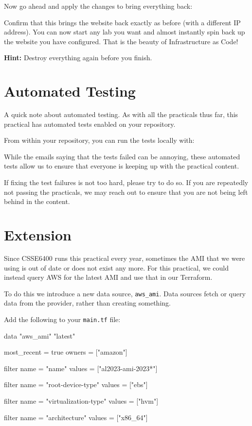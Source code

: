 \documentclass{csse4400}
\begin{document}
Now go ahead and apply the changes to bring everything back:

Confirm that this brings the website back exactly as before (with a different IP address).
You can now start any lab you want and almost instantly spin back up the website you have configured.
That is the beauty of Infrastructure as Code!

\textbf{Hint:} Destroy everything again before you finish.


\section{Automated Testing}
A quick note about automated testing.
As with all the practicals thus far,
this practical has automated tests enabled on your repository.

From within your repository, you can run the tests locally with:

While the emails saying that the tests failed can be annoying,
these automated tests allow us to ensure that everyone is keeping up with the practical content.

If fixing the test failures is not too hard,
please try to do so.
If you are repeatedly not passing the practicals,
we may reach out to ensure that you are not being left behind in the content.


\section{Extension}


Since CSSE6400 runs this practical every year, sometimes the AMI that we were using is out of date or does not exist any more.
For this practical, we could instead query AWS for the latest AMI and use that in our Terraform.

To do this we introduce a new data source, \texttt{aws\_ami}.
Data sources fetch or query data from the provider, rather than creating something.

Add the following to your \texttt{main.tf} file:

\begin{code}[language=terraform,numbers=none]{}
data "aws_ami" "latest" {
  most_recent = true
  owners      = ["amazon"]

  filter {
    name   = "name"
    values = ["al2023-ami-2023*"]
  }

  filter {
    name   = "root-device-type"
    values = ["ebs"]
  }

  filter {
    name   = "virtualization-type"
    values = ["hvm"]
  }

  filter {
    name   = "architecture"
    values = ["x86_64"]
  }
}
\end{code}
\end{document}
